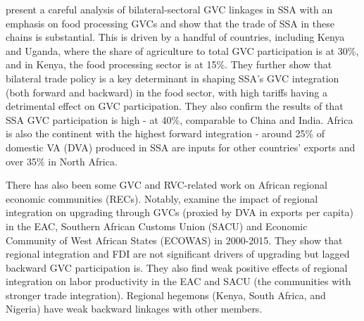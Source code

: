 \documentclass[a4paper]{article}
\begin{document}
\citet{balie2019does} present a careful analysis of bilateral-sectoral GVC linkages in SSA with an emphasis on food processing GVCs and show that the trade of SSA in these chains is substantial. This is driven by a handful of countries, including Kenya and Uganda, where the share of agriculture to total GVC participation is at 30\%, and in Kenya, the food processing sector is at 15\%. They further show that bilateral trade policy is a key determinant in shaping SSA's GVC integration (both forward and backward) in the food sector, with high tariffs having a detrimental effect on GVC participation. They also confirm the results of \citet{foster2015global} that SSA GVC participation is high - at 40\%, comparable to China and India. Africa is also the continent with the highest forward integration - around 25\% of domestic VA (DVA) produced in SSA are inputs for other countries' exports and over 35\% in North Africa. \newline

There has also been some GVC and RVC-related work on African regional economic communities (RECs). Notably, \citet{obasaju2021regional} examine the impact of regional integration on upgrading through GVCs (proxied by DVA in exports per capita) in the EAC, Southern African Customs Union (SACU) and Economic Community of West African States (ECOWAS) in 2000-2015. %
They show that regional integration and FDI are not significant drivers of upgrading but lagged backward GVC participation is. They also find weak positive effects of regional integration on labor productivity in the EAC and SACU (the communities with stronger trade integration). Regional hegemons (Kenya, South Africa, and Nigeria) have weak backward linkages with other members. \newline 
\end{document}

